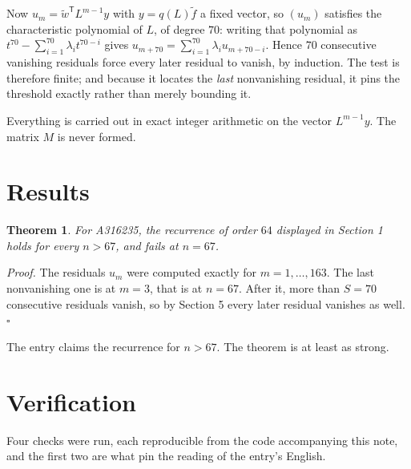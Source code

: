 \documentclass[11pt]{article}
\newtheorem{theorem}{Theorem}
\theoremstyle{definition}
\begin{document}
Now $u_m = \tilde w^{\mathsf T} L^{m-1} y$ with $y = q(L)\tilde f$ a fixed vector, so $(u_m)$ satisfies the characteristic polynomial of $L$, of degree $70$: writing that polynomial as $t^{70} - \sum_{i=1}^{70} \lambda_i t^{70-i}$ gives $u_{m+70} = \sum_{i=1}^{70} \lambda_i u_{m+70-i}$. Hence $70$ consecutive vanishing residuals force every later residual to vanish, by induction. The test is therefore finite; and because it locates the {\itshape last} nonvanishing residual, it pins the threshold exactly rather than merely bounding it.

Everything is carried out in exact integer arithmetic on the vector $L^{m-1}y$. The matrix $M$ is never formed.

\section{Results}

\begin{theorem} For A316235, the recurrence of order $64$ displayed in Section 1 holds for every $n > 67$, and fails at $n = 67$.\end{theorem}

{\itshape Proof.} The residuals $u_m$ were computed exactly for $m = 1,\dots,163$. The last nonvanishing one is at $m = 3$, that is at $n = 67$. After it, more than $S = 70$ consecutive residuals vanish, so by Section 5 every later residual vanishes as well. $\square$

The entry claims the recurrence for $n > 67$. The theorem is at least as strong.

\section{Verification}

Four checks were run, each reproducible from the code accompanying this note, and the first two are what pin the reading of the entry's English.
\end{document}
